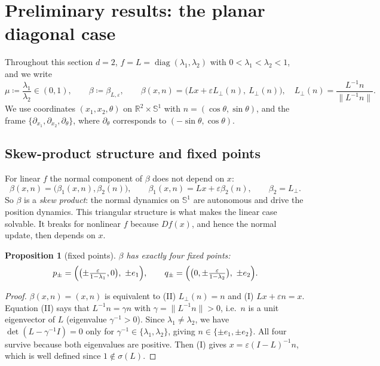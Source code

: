 \documentclass[11pt,a4paper]{article}
\newtheorem{proposition}[theorem]{Proposition}
\theoremstyle{definition}
\theoremstyle{remark}
\newcommand{\R}{\mathbb{R}}
\newcommand{\eps}{\varepsilon}
\newcommand{\Sph}{\mathbb{S}}
\newcommand{\Lperp}{L_\perp}
\DeclareMathOperator{\diag}{diag}
\begin{document}
\section{Preliminary results: the planar diagonal case}\label{sec:results}

Throughout this section $d=2$, $f=L=\diag(\lambda_1,\lambda_2)$ with $0<\lambda_1<\lambda_2<1$, and we write
\[
  \mu\coloneqq\frac{\lambda_1}{\lambda_2}\in(0,1),\qquad \beta\coloneqq\beta_{L,\eps},\qquad
  \beta(x,n)=\bigl(Lx+\eps\Lperp(n),\ \Lperp(n)\bigr),\quad \Lperp(n)=\frac{L^{-1}n}{\|L^{-1}n\|}.
\]
We use coordinates $(x_1,x_2,\theta)$ on $\R^2\times\Sph^1$ with $n=(\cos\theta,\sin\theta)$, and the frame
$\{\partial_{x_1},\partial_{x_2},\partial_\theta\}$, where $\partial_\theta$ corresponds to $(-\sin\theta,\cos\theta)$.

\subsection{Skew-product structure and fixed points}
For linear $f$ the normal component of $\beta$ does not depend on $x$:
\[
  \beta(x,n)=\bigl(\beta_1(x,n),\beta_2(n)\bigr),\qquad \beta_1(x,n)=Lx+\eps\beta_2(n),\qquad \beta_2=\Lperp .
\]
So $\beta$ is a \emph{skew product}: the normal dynamics on $\Sph^1$ are autonomous and drive the position dynamics.
This triangular structure is what makes the linear case solvable. It breaks for nonlinear $f$ because $Df(x)$, and
hence the normal update, then depends on $x$.

\begin{proposition}[fixed points]\label{prop:fixed}
$\beta$ has exactly four fixed points:
\[
  p_\pm=\Bigl(\bigl(\pm\tfrac{\eps}{1-\lambda_1},0\bigr),\ \pm e_1\Bigr),\qquad
  q_\pm=\Bigl(\bigl(0,\pm\tfrac{\eps}{1-\lambda_2}\bigr),\ \pm e_2\Bigr).
\]
\end{proposition}
\begin{proof}
$\beta(x,n)=(x,n)$ is equivalent to (II) $\Lperp(n)=n$ and (I) $Lx+\eps n=x$. Equation (II) says that
$L^{-1}n=\gamma n$ with $\gamma=\|L^{-1}n\|>0$, i.e.\ $n$ is a unit eigenvector of $L$ (eigenvalue $\gamma^{-1}>0$). Since
$\lambda_1\neq\lambda_2$, we have $\det(L-\gamma^{-1}I)=0$ only for $\gamma^{-1}\in\{\lambda_1,\lambda_2\}$, giving
$n\in\{\pm e_1,\pm e_2\}$. All four survive because both eigenvalues are positive. Then (I) gives
$x=\eps(I-L)^{-1}n$, which is well defined since $1\notin\sigma(L)$.
\end{proof}
\end{document}
